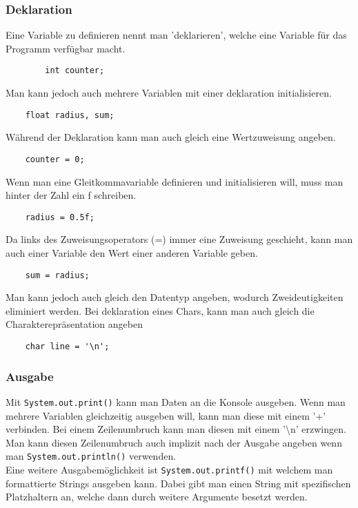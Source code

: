 \documentclass{article}
\begin{document}
	\subsubsection{Deklaration}
	Eine Variable zu definieren nennt man 'deklarieren', welche eine Variable für das Programm verfügbar macht.
	\begin{verbatim}
		int counter;
	\end{verbatim}
	Man kann jedoch auch mehrere Variablen mit einer deklaration initialisieren.
	\begin{verbatim}
	float radius, sum;
	\end{verbatim}
	Während der Deklaration kann man auch gleich eine Wertzuweisung angeben.
	\begin{verbatim}
	counter = 0;
	\end{verbatim}
	Wenn man eine Gleitkommavariable definieren und initialisieren will, muss man hinter der Zahl ein f schreiben.
	\begin{verbatim}
	radius = 0.5f;
	\end{verbatim}
	Da links des Zuweisungsoperators (=) immer eine Zuweisung geschieht, kann man auch einer Variable den Wert einer anderen Variable geben. 	
	\begin{verbatim}
	sum = radius;
	\end{verbatim}
	Man kann jedoch auch gleich den Datentyp angeben, wodurch Zweideutigkeiten eliminiert werden. Bei deklaration eines Chars, kann man auch gleich die Charakterepräsentation angeben
	\begin{verbatim}
	char line = '\n';
	\end{verbatim}
	\subsubsection{Ausgabe}
	Mit \verb|System.out.print()| kann man Daten an die Konsole ausgeben. Wenn man mehrere Variablen gleichzeitig ausgeben will, kann man diese mit einem '+' verbinden. Bei einem Zeilenumbruch kann man diesen mit einem '\textbackslash n' erzwingen.\\
	Man kann diesen Zeilenumbruch auch implizit nach der Ausgabe angeben wenn man \verb|System.out.println()| verwenden. \\
	Eine weitere Ausgabemöglichkeit ist \verb|System.out.printf()| mit welchem man formattierte Strings ausgeben kann. Dabei gibt man einen String mit spezifischen Platzhaltern an, welche dann durch weitere Argumente besetzt werden.
\end{document}
